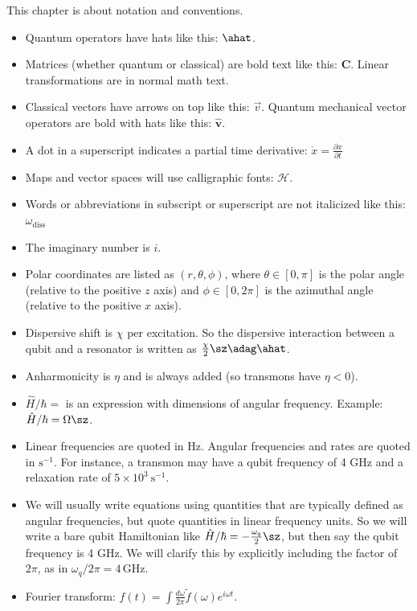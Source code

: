 This chapter is about notation and conventions.

\begin{itemize}
\item Quantum operators have hats like this: $\ahat$.

\item Matrices (whether quantum or classical) are bold text like this: $\mathbf{C}$. Linear transformations are in normal math text.

\item Classical vectors have arrows on top like this: $\vec{v}$. Quantum mechanical vector operators are bold with hats like this: $\mathbf{\hat{v}}$.

\item A dot in a superscript indicates a partial time derivative: $\dot{x}=\frac{\partial x}{\partial t}$

\item Maps and vector spaces will use calligraphic fonts: $\mathcal{H}$.

\item Words or abbreviations in subscript or superscript are not italicized like this: $\omega_\mathrm{diss}$

\item The imaginary number is $i$.

\item Polar coordinates are listed as $(r,\theta,\phi)$, where $\theta \in [ 0, \pi ]$ is the polar angle (relative to the positive $z$ axis) and $\phi \in [ 0,2\pi ]$ is the azimuthal angle (relative to the positive $x$ axis).

\item Dispersive shift is $\chi$ per excitation. So the dispersive interaction between a qubit and a resonator is written as $\frac{\chi}{2}\sz\adag\ahat$.

\item Anharmonicity is $\eta$ and is always added (so transmons have $\eta < 0 $).

\item $\hat{H} / \hbar =$ is an expression with dimensions of angular frequency. Example: $\hat{H} / \hbar = \Omega \sz$.

\item Linear frequencies are quoted in Hz. Angular frequencies and rates are quoted in $\mathrm{s}^{-1}$. For instance, a transmon may have a qubit frequency of 4 GHz and a relaxation rate of $5\times10^3 \ \mathrm{s}^{-1}$.

\item We will usually write equations using quantities that are typically defined as angular frequencies, but quote quantities in linear frequency units. So we will write a bare qubit Hamiltonian like $\hat{H}/\hbar = -\frac{\omega_q}{2}\sz$, but then say the qubit frequency is 4 GHz. We will clarify this by explicitly including the factor of $2\pi$, as in $\omega_q / 2\pi = 4\,\text{GHz}$.

\item Fourier transform: $f(t) = \int \frac{d\omega}{2 \pi} \tilde{f}(\omega) e^{i \omega t}$.
\end{itemize}